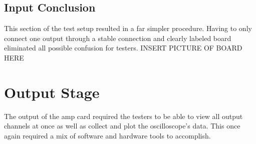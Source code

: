 \subsection{Input Conclusion}
This section of the test setup resulted in a far simpler procedure. Having to only connect one output through a stable connection and clearly labeled board eliminated all possible confusion for testers. INSERT PICTURE OF BOARD HERE

\section{Output Stage}
The output of the amp card required the testers to be able to view all output channels at once as well as collect and plot the oscilloscope's data. This once again required a mix of software and hardware tools to accomplish.